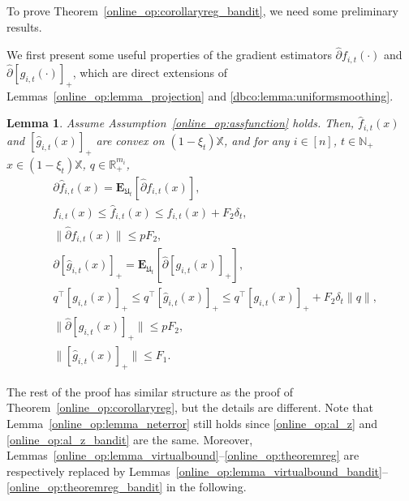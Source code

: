 \documentclass[12pt,draftcls,onecolumn]{IEEEtran}%
\newtheorem{lemma}{Lemma}
\begin{document}
To prove Theorem~\ref{online_op:corollaryreg_bandit}, we need some preliminary results.

We first present some useful properties of the gradient estimators $\hat{\partial}f_{i,t}(\cdot)$ and $\hat{\partial}[g_{i,t}(\cdot)]_+$, which are direct extensions of Lemmas~\ref{online_op:lemma_projection} and \ref{dbco:lemma:uniformsmoothing}.
\begin{lemma}\label{online_op:lemma_gradient}
Assume Assumption~\ref{online_op:assfunction} holds.
Then, $\hat{f}_{i,t}(x)$ and $[\hat{g}_{i,t}(x)]_+$ are convex on $(1-\xi_{t})\mathbb{X}$, and for any $i\in[n]$, $t\in\mathbb{N}_+$ $x\in(1-\xi_{t})\mathbb{X}$, $q\in\mathbb{R}^{m_i}_+$,
\begin{subequations}
\begin{align}
&\partial\hat{f}_{i,t}(x)=\mathbf{E}_{\mathfrak{U}_{t}}[\hat{\partial}f_{i,t}(x)],
\label{dbco:lemma_regretdeltaequ:fsmooth1}\\
&f_{i,t}(x)\le \hat{f}_{i,t}(x)\le f_{i,t}(x)+F_2\delta_{t} ,\label{dbco:lemma_regretdeltaequ:fsmooth2}\\
&\|\hat{\partial}f_{i,t}(x)\|\le pF_2,
\label{dbco:lemma_regretdeltaequ:fsmooth3}\\
&\partial[\hat{g}_{i,t}(x)]_+=\mathbf{E}_{\mathfrak{U}_{t}}[\hat{\partial}[g_{i,t}(x)]_+],
\label{dbco:lemma_regretdeltaequ:gsmooth1}\\
&q^\top[g_{i,t}(x)]_+\le q^\top[\hat{g}_{i,t}(x)]_+\le q^\top[g_{i,t}(x)]_++ F_2\delta_{t}\|q\|,\label{dbco:lemma_regretdeltaequ:gsmooth2}\\
&\|\hat{\partial}[g_{i,t}(x)]_+\|\le pF_2,
\label{dbco:lemma_regretdeltaequ:gsmooth4}\\
&\|[\hat{g}_{i,t}(x)]_+\|\le F_1.\label{dbco:lemma_regretdeltaequ:gsmooth3}
\end{align}
\end{subequations}
\end{lemma}

The rest of the proof has similar structure as the proof of Theorem~\ref{online_op:corollaryreg}, but the details are different. Note that Lemma~\ref{online_op:lemma_neterror} still holds since \eqref{online_op:al_z} and \eqref{online_op:al_z_bandit} are the same. Moreover, Lemmas~\ref{online_op:lemma_virtualbound}--\ref{online_op:theoremreg} are respectively replaced by Lemmas~\ref{online_op:lemma_virtualbound_bandit}--\ref{online_op:theoremreg_bandit} in the following.
\end{document}
